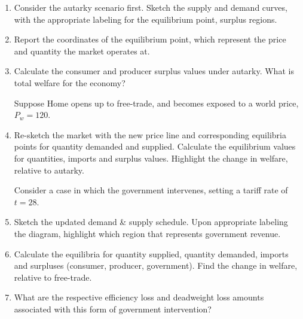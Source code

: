 \documentclass[12pt]{article}
\begin{document}
\begin{enumerate}[1)]
	\item Consider the autarky scenario first. Sketch the supply and demand curves, with the appropriate labeling for the equilibrium point, surplus regions.
	
	\vspace{2.4in}
	
	\item Report the coordinates of the equilibrium point, which represent the price and quantity the market operates at.
	
	\vspace{1in}
	
	
	\item Calculate the consumer and producer surplus values under autarky.  What is total welfare for the economy?
	
	\vspace{1.4in}
	
	\noindent Suppose Home opens up to free-trade, and becomes exposed to a world price, $P_w = 120$. 
	
	\item Re-sketch the market with the new price line and corresponding equilibria points for quantity demanded and supplied. 
	Calculate the equilibrium values for quantities, imports and surplus values. 
	Highlight the change in welfare, relative to autarky. 
	
	\vspace{4in}
	
	\newpage
	
	\noindent Consider a case in which the government intervenes, setting a tariff rate of $t=28$. 
	
	\item Sketch the updated demand \& supply schedule. Upon appropriate labeling the diagram, highlight which region that represents government revenue.
	
	\vspace{3.5in}
	
	\item Calculate the equilibria for quantity supplied, quantity demanded, imports and surpluses (consumer, producer, government). 
	Find the change in welfare, relative to free-trade. 
	
	\vspace{2in}
	
	\item What are the respective efficiency loss and deadweight loss amounts associated with this form of government intervention?
	
\end{enumerate}
\end{document}
